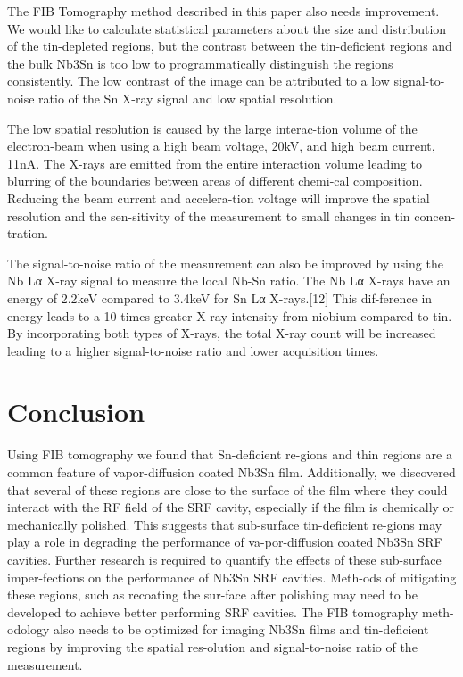 The FIB Tomography method described in this paper also needs improvement. We would like to calculate statistical parameters about the size and distribution of the tin-depleted regions, but the contrast between the tin-deficient regions and the bulk Nb3Sn is too low to programmatically distinguish the regions consistently. The low contrast of the image can be attributed to a low signal-to-noise ratio of the Sn X-ray signal and low spatial resolution.

The low spatial resolution is caused by the large interac-tion volume of the electron-beam when using a high beam voltage, 20kV, and high beam current, 11nA. The X-rays are emitted from the entire interaction volume leading to blurring of the boundaries between areas of different chemi-cal composition. Reducing the beam current and accelera-tion voltage will improve the spatial resolution and the sen-sitivity of the measurement to small changes in tin concen-tration. 

The signal-to-noise ratio of the measurement can also be improved by using the Nb Lα X-ray signal to measure the local Nb-Sn ratio. The Nb Lα X-rays have an energy of 2.2keV compared to 3.4keV for Sn Lα X-rays.[12] This dif-ference in energy leads to a 10 times greater X-ray intensity from niobium compared to tin. By incorporating both types of X-rays, the total X-ray count will be increased leading to a higher signal-to-noise ratio and lower acquisition times.


\section{Conclusion}

Using FIB tomography we found that Sn-deficient re-gions and thin regions are a common feature of vapor-diffusion coated Nb3Sn film. Additionally, we discovered that several of these regions are close to the surface of the film where they could interact with the RF field of the SRF cavity, especially if the film is chemically or mechanically polished. This suggests that sub-surface tin-deficient re-gions may play a role in degrading the performance of va-por-diffusion coated Nb3Sn SRF cavities. Further research is required to quantify the effects of these sub-surface imper-fections on the performance of Nb3Sn SRF cavities. Meth-ods of mitigating these regions, such as recoating the sur-face after polishing may need to be developed to achieve better performing SRF cavities. The FIB tomography meth-odology also needs to be optimized for imaging Nb3Sn films and tin-deficient regions by improving the spatial res-olution and signal-to-noise ratio of the measurement.
